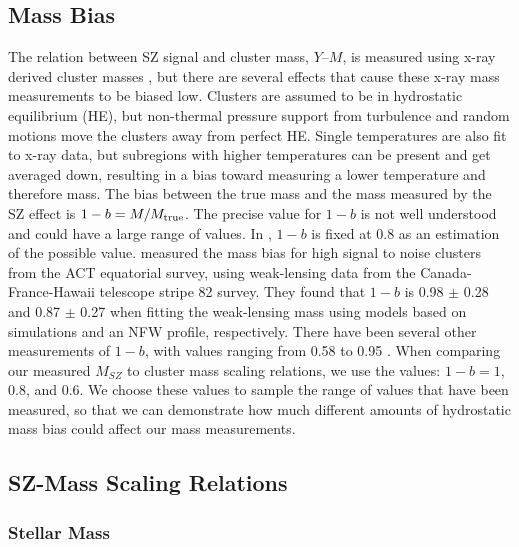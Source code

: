 \documentclass[a4paper,fleqn,usenatbib]{mnras}
\begin{document}
\subsection{Mass Bias}



The relation between SZ signal and cluster mass, $Y$--$M$, is measured using x-ray derived cluster masses \citep{2010A&A...517A..92A, 2011ApJ...738...48A}, but there are several effects that cause these x-ray mass measurements to be biased low. Clusters are assumed to be in hydrostatic equilibrium (HE), but non-thermal pressure support from turbulence and random motions move the clusters away from perfect HE. Single temperatures are also fit to x-ray data, but subregions with higher temperatures can be present and get averaged down, resulting in a bias toward measuring a lower temperature and therefore mass. The bias between the true mass and the mass measured by the SZ effect is $1-b = M/M_{\rm true}$. The precise value for $1-b$ is not well understood and could have a large range of values\citep{2014A&A...571A..16P}. In \cite{2014A&A...571A..16P}, $1-b$ is fixed at 0.8 as an estimation of the possible value. \cite{2016JCAP...08..013B} measured the mass bias for high signal to noise clusters from the ACT equatorial survey, using weak-lensing data from the Canada-France-Hawaii telescope stripe 82 survey. They found that $1-b$ is 0.98 $\pm$ 0.28 and 0.87 $\pm$ 0.27 when fitting the weak-lensing mass using models based on simulations and an NFW profile, respectively. There have been several other measurements of $1-b$, with values ranging from 0.58 to 0.95 \citep{2014MNRAS.443.1973V,2015MNRAS.449..685H,2016MNRAS.456L..74S,2016A&A...594A..24P}. When comparing our measured $M_{SZ}$ to cluster mass scaling relations, we use the values: $1-b = 1$, 0.8, and 0.6. We choose these values to sample the range of values that have been measured, so that we can demonstrate how much different amounts of hydrostatic mass bias could affect our mass measurements. 


\iffalse
\subsection{SZ-Mass Scaling Relations}

\subsubsection{Stellar Mass}
\end{document}
